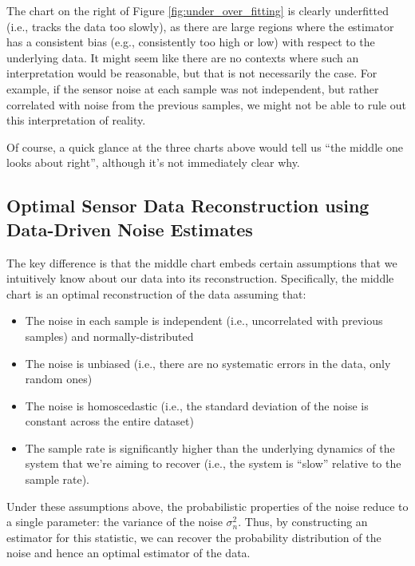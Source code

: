\documentclass[conf]{new-aiaa}
\begin{document}
    The chart on the right of Figure \ref{fig:under_over_fitting} is clearly underfitted (i.e., tracks the data too slowly), as there are large regions where the estimator has a consistent bias (e.g., consistently too high or low) with respect to the underlying data. It might seem like there are no contexts where such an interpretation would be reasonable, but that is not necessarily the case. For example, if the sensor noise at each sample was not independent, but rather correlated with noise from the previous samples, we might not be able to rule out this interpretation of reality.

    Of course, a quick glance at the three charts above would tell us ``the middle one looks about right'', although it's not immediately clear why.

    \subsection{Optimal Sensor Data Reconstruction using Data-Driven Noise Estimates}
    \label{subsec:optimal_sensor_data_reconstruction}

    The key difference is that the middle chart embeds certain assumptions that we intuitively know about our data into its reconstruction. Specifically, the middle chart is an optimal reconstruction of the data assuming that:

    \begin{itemize}
        \item The noise in each sample is independent (i.e., uncorrelated with previous samples) and normally-distributed
        \item The noise is unbiased (i.e., there are no systematic errors in the data, only random ones)
        \item The noise is homoscedastic (i.e., the standard deviation of the noise is constant across the entire dataset)
        \item The sample rate is significantly higher than the underlying dynamics of the system that we're aiming to recover (i.e., the system is ``slow'' relative to the sample rate).
    \end{itemize}

    Under these assumptions above, the probabilistic properties of the noise reduce to a single parameter: the variance of the noise $\sigma^2_n$. Thus, by constructing an estimator for this statistic, we can recover the probability distribution of the noise and hence an optimal estimator of the data.
\end{document}
